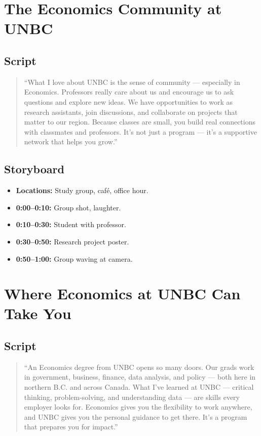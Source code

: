 \documentclass[12pt]{article}
\begin{document}
\section{The Economics Community at UNBC}

\subsection*{Script}
\begin{quote}
``What I love about UNBC is the sense of community — especially in Economics. 
Professors really care about us and encourage us to ask questions and explore new ideas. 
We have opportunities to work as research assistants, join discussions, and collaborate on projects that matter to our region. 
Because classes are small, you build real connections with classmates and professors. 
It’s not just a program — it’s a supportive network that helps you grow.''
\end{quote}

\subsection*{Storyboard}
\begin{itemize}[leftmargin=*]
    \item \textbf{Locations:} Study group, café, office hour.
    \item \textbf{0:00–0:10:} Group shot, laughter.
    \item \textbf{0:10–0:30:} Student with professor.
    \item \textbf{0:30–0:50:} Research project poster.
    \item \textbf{0:50–1:00:} Group waving at camera.
\end{itemize}

\section{Where Economics at UNBC Can Take You}

\subsection*{Script}
\begin{quote}
``An Economics degree from UNBC opens so many doors. 
Our grads work in government, business, finance, data analysis, and policy — both here in northern B.C. and across Canada. 
What I’ve learned at UNBC — critical thinking, problem-solving, and understanding data — are skills every employer looks for. 
Economics gives you the flexibility to work anywhere, and UNBC gives you the personal guidance to get there. 
It’s a program that prepares you for impact.''
\end{quote}
\end{document}
